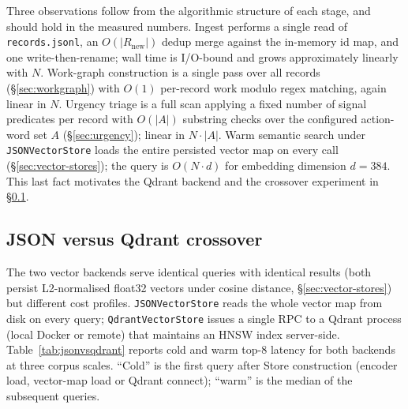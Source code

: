 Three observations follow from the algorithmic structure of each stage, and
should hold in the measured numbers. Ingest performs a single read of
\texttt{records.jsonl}, an $O(|R_{\text{new}}|)$ dedup merge against the
in-memory id map, and one write-then-rename; wall time is I/O-bound and grows
approximately linearly with $N$. Work-graph construction is a single pass over
all records (\S\ref{sec:workgraph}) with $O(1)$ per-record work modulo regex
matching, again linear in $N$. Urgency triage is a full scan applying a fixed
number of signal predicates per record with $O(|A|)$ substring checks over the
configured action-word set $A$ (\S\ref{sec:urgency}); linear in $N \cdot |A|$.
Warm semantic search under \texttt{JSONVectorStore} loads the entire
persisted vector map on every call (\S\ref{sec:vector-stores}); the query is
$O(N \cdot d)$ for embedding dimension $d = 384$. This last fact motivates
the Qdrant backend and the crossover experiment in
\S\ref{sec:eval-jsonvsqdrant}.

\subsection{JSON versus Qdrant crossover}
\label{sec:eval-jsonvsqdrant}

The two vector backends serve identical queries with identical results (both
persist L2-normalised float32 vectors under cosine distance,
\S\ref{sec:vector-stores}) but different cost profiles.
\texttt{JSONVectorStore} reads the whole vector map from disk on every query;
\texttt{QdrantVectorStore} issues a single RPC to a Qdrant process (local
Docker or remote) that maintains an HNSW index server-side. Table~\ref{tab:jsonvsqdrant}
reports cold and warm top-$8$ latency for both backends at three corpus scales.
``Cold'' is the first query after Store construction (encoder load, vector-map
load or Qdrant connect); ``warm'' is the median of the subsequent queries.

